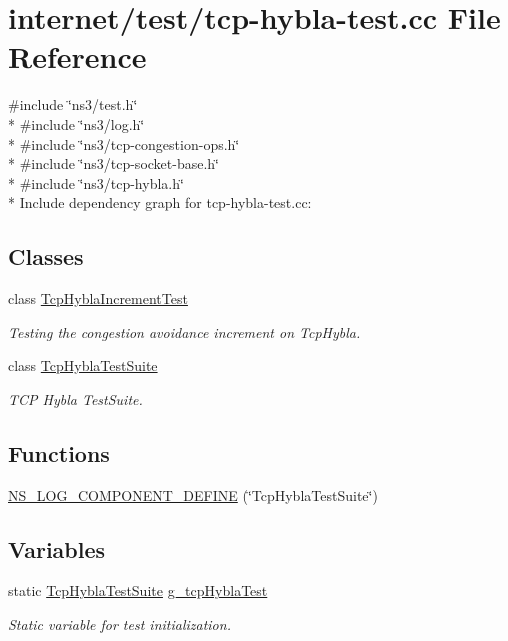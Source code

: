 \hypertarget{tcp-hybla-test_8cc}{}\section{internet/test/tcp-\/hybla-\/test.cc File Reference}
\label{tcp-hybla-test_8cc}
{\ttfamily \#include \char`\"{}ns3/test.\+h\char`\"{}}\\*
{\ttfamily \#include \char`\"{}ns3/log.\+h\char`\"{}}\\*
{\ttfamily \#include \char`\"{}ns3/tcp-\/congestion-\/ops.\+h\char`\"{}}\\*
{\ttfamily \#include \char`\"{}ns3/tcp-\/socket-\/base.\+h\char`\"{}}\\*
{\ttfamily \#include \char`\"{}ns3/tcp-\/hybla.\+h\char`\"{}}\\*
Include dependency graph for tcp-\/hybla-\/test.cc\+:
\subsection*{Classes}
\begin{DoxyCompactItemize}
\item 
class \hyperlink{classTcpHyblaIncrementTest}{Tcp\+Hybla\+Increment\+Test}
\begin{DoxyCompactList}\small\item\em Testing the congestion avoidance increment on Tcp\+Hybla. \end{DoxyCompactList}\item 
class \hyperlink{classTcpHyblaTestSuite}{Tcp\+Hybla\+Test\+Suite}
\begin{DoxyCompactList}\small\item\em T\+CP Hybla Test\+Suite. \end{DoxyCompactList}\end{DoxyCompactItemize}
\subsection*{Functions}
\begin{DoxyCompactItemize}
\item 
\hyperlink{tcp-hybla-test_8cc_a7838bb6fa4b38cfb6bebba7f2d2460c7}{N\+S\+\_\+\+L\+O\+G\+\_\+\+C\+O\+M\+P\+O\+N\+E\+N\+T\+\_\+\+D\+E\+F\+I\+NE} (\char`\"{}Tcp\+Hybla\+Test\+Suite\char`\"{})
\end{DoxyCompactItemize}
\subsection*{Variables}
\begin{DoxyCompactItemize}
\item 
static \hyperlink{classTcpHyblaTestSuite}{Tcp\+Hybla\+Test\+Suite} \hyperlink{tcp-hybla-test_8cc_a05610294916120c0959854f8334a096b}{g\+\_\+tcp\+Hybla\+Test}
\begin{DoxyCompactList}\small\item\em Static variable for test initialization. \end{DoxyCompactList}\end{DoxyCompactItemize}


